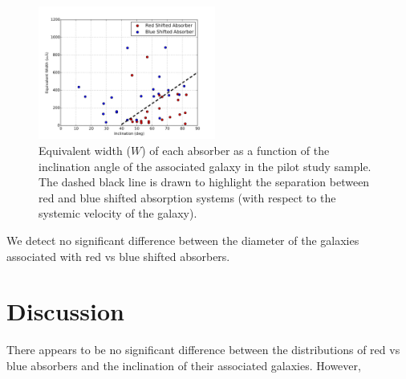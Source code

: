 \documentclass[iop]{emulateapj-rtx4}
\begin{document}
\begin{figure}[h!]
        \centering
        \includegraphics[width=0.52\textwidth]{Wvsinclinationfinal3.jpg}
        \caption{\small{Equivalent width ($W$) of each absorber as a function of the inclination angle of the associated galaxy in the pilot study sample. The dashed black line is drawn to highlight the separation between red and blue shifted absorption systems (with respect to the systemic velocity of the galaxy).}}
        \label{ew_vs_inclination}
\end{figure} 





We detect no significant difference between the diameter of the galaxies associated with red vs blue shifted absorbers.


\section{Discussion}


There appears to be no significant difference between the distributions of red vs blue absorbers and the inclination of their associated galaxies. However, 
\end{document}
